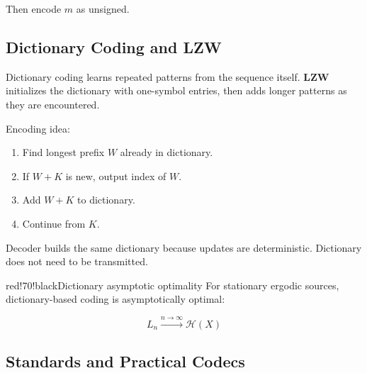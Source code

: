 Then encode $m$ as unsigned.

\subsection{Dictionary Coding and LZW}

Dictionary coding learns repeated patterns from the sequence itself. \textbf{LZW} initializes the dictionary with one-symbol entries, then adds longer patterns as they are encountered.

Encoding idea:

\begin{enumerate}
  \item Find longest prefix $W$ already in dictionary.
  \item If $W+K$ is new, output index of $W$.
  \item Add $W+K$ to dictionary.
  \item Continue from $K$.
\end{enumerate}

Decoder builds the same dictionary because updates are deterministic. Dictionary does not need to be transmitted.

\begin{calloutbox}{red!70!black}{Dictionary asymptotic optimality}
For stationary ergodic sources, dictionary-based coding is asymptotically optimal:

\[
L_n\xrightarrow{n\to\infty}\mathcal{H}(X)
\]
\end{calloutbox}

\subsection{Standards and Practical Codecs}

\begin{center}
\end{center}

